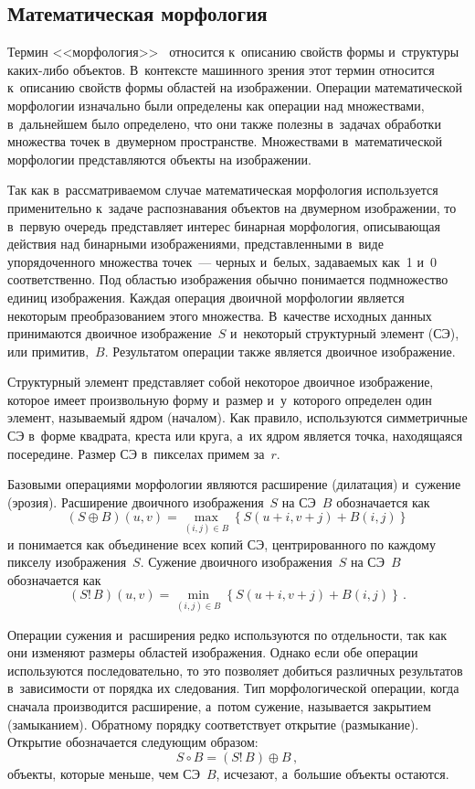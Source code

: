 \begin{multicols}{2}
\section{Математическая морфология}

  Термин <<морфология>>~\cite{11-ab} относится к~описанию свойств формы и~структуры ка\-ких-ли\-бо объектов. В~контексте машинного зрения этот
термин относится к~описанию свойств формы областей на изображении.
Операции математической морфологии изначально были определены как
операции над множествами, в~дальнейшем было определено, что они также
полезны в~задачах обработки мно\-жества точек в~двумерном пространстве.
Множествами в~математической морфологии пред\-став\-ля\-ют\-ся объекты на
изображении.

  Так как в~рассматриваемом случае математическая морфология используется
применительно к~зада\-че распознавания объектов на двумерном изоб\-ра\-же\-нии,
то в~первую очередь представляет интерес бинарная морфология, описывающая\linebreak
действия над бинарными изображениями, пред\-став\-лен\-ны\-ми в~виде
упорядоченного множества точек~--- черных и~белых, задаваемых как~1 и~0
соответственно. Под областью изображения обычно понимается подмножество
единиц изображения. Каждая операция двоичной морфологии является
некоторым преобразованием этого множества. В~качестве исходных данных
принимаются двоичное изображение~$S$ и~некоторый структурный элемент
(СЭ), или примитив,~$B$. Результатом операции также является двоичное
изображение.

  Структурный элемент представляет собой некоторое двоичное изображение,
которое имеет произвольную форму и~размер и~у~которого определен один
элемент, называемый ядром (началом). Как правило, используются
симметричные СЭ в~форме квадрата, креста или круга, а~их ядром является
точка, находящаяся посередине. Размер СЭ в~пикселах примем за~$r$.

  Базовыми операциями морфологии являются расширение (дилатация) и~сужение (эрозия). Расширение двоичного изображения~$S$ на СЭ~$B$
обозначается как
  $$
  (S\oplus  B) (u,v) =\max\limits_{(i,j)\in B} \left\{ S(u+i,v+j)+B(i,j)\right\}
  $$
и понимается как объединение всех копий СЭ, центрированного по каждому
пикселу изображения~$S$. Сужение двоичного изображения~$S$ на СЭ~$B$
обозначается как
$$
(S!\, B) (u,v) =\min\limits_{(i,j)\in B} \left\{ S(u+i, v+j)+B(i,j)\right\}\,.
$$

  Операции сужения и~расширения редко используются по отдельности, так
как они изменяют размеры областей изображения. Однако если обе опера\-ции
используются последовательно, то это позволяет добиться различных
результатов в~зависимости от порядка их следования. Тип морфологической
операции, когда сначала производится расширение, а~потом сужение,
называется закрытием (замыканием). Обратному порядку соответствует
открытие (размыкание). Открытие обозначается следующим образом:
  \begin{equation}
  S\circ B = (S!\, B)\oplus B\,,
  \label{e1-ab}
  \end{equation}
объекты, которые меньше, чем СЭ~$B$, исчезают, а~большие объекты
остаются.


\end{multicols}
